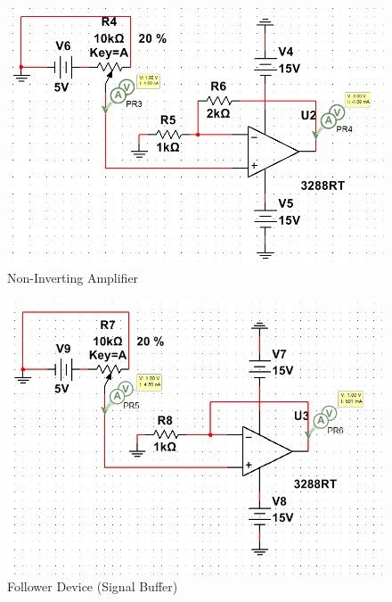 \documentclass[12pt]{article}
\begin{document}
\bigskip

\begin{figure}[h!] %
   \centering
   \includegraphics[width=5in]{non_inverting.PNG} 
   \caption{Non-Inverting Amplifier}
   \label{fig:example}
\end{figure}

\newpage

\begin{figure}[h!] %
   \centering
   \includegraphics[width=5in]{follower.PNG} 
   \caption{Follower Device (Signal Buffer)}
   \label{fig:example}
\end{figure}

\bigskip
\end{document}

